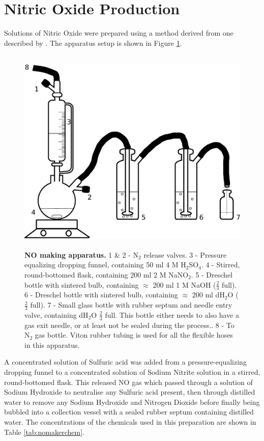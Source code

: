 \section{Nitric Oxide Production}
Solutions of Nitric Oxide were prepared using a method derived from one described by \citet{Aga2008}. The apparatus setup is shown in Figure \ref{fig:nomaker}.
\begin{figure}[tbp]
 \centering
 \includegraphics[height=10cm]{./02-materialsmethods/data/drawing.pdf}
 \caption[NO making apparatus.]{{\bf NO making apparatus.} 1 \& 2 - N$_{\textrm{2}}$ release valves. 3 - Pressure equalizing dropping funnel, containing 50 ml 4 M H$_{\textrm{2}}$SO$_{\textrm{4}}$. 4 - Stirred, round-bottomed flask, containing 200 ml 2 M NaNO$_{\textrm{2}}$. 5 - Dreschel bottle with sintered bulb, containing $\approx$ 200 ml 1 M NaOH ($\frac{2}{3}$ full). 6 - Dreschel bottle with sintered bulb, containing $\approx$ 200 ml dH$_{\textrm{2}}$O ($\frac{2}{3}$ full). 7 - Small glass bottle with rubber septum and needle entry valve, containing dH$_{\textrm{2}}$O $\frac{2}{3}$ full. This bottle either needs to also have a gas exit needle, or at least not be sealed during the process.. 8 - To N$_{\textrm{2}}$ gas bottle. Viton rubber tubing is used for all the flexible hoses in this apparatus.
 \label{fig:nomaker}}
\end{figure}
A concentrated solution of Sulfuric acid was added from a pressure-equalizing dropping funnel to a concentrated solution of Sodium Nitrite solution in a stirred, round-bottomed flask. This released NO gas which passed through a solution of Sodium Hydroxide to neutralise any Sulfuric acid present, then through distilled water to remove any Sodium Hydroxide and Nitrogen Dioxide before finally being bubbled into a collection vessel with a sealed rubber septum containing distilled water. The concentrations of the chemicals used in this preparation are shown in Table \ref{tab:nomakerchem}.
